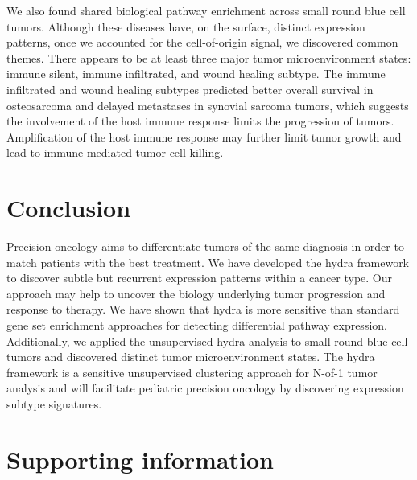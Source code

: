 \documentclass[10pt,letterpaper]{article}
\begin{document}
We also found shared biological pathway enrichment across small round blue cell tumors. Although these diseases have, on the surface, distinct expression patterns, once we accounted for the cell-of-origin signal, we discovered common themes. There appears to be at least three major tumor microenvironment states: immune silent, immune infiltrated, and wound healing subtype. The immune infiltrated and wound healing subtypes predicted better overall survival in osteosarcoma and delayed metastases in synovial sarcoma tumors, which suggests the involvement of the host immune response limits the progression of tumors. Amplification of the host immune response may further limit tumor growth and lead to immune-mediated tumor cell killing.

\section*{Conclusion}
Precision oncology aims to differentiate tumors of the same diagnosis in order to match patients with the best treatment. We have developed the hydra framework to discover subtle but recurrent expression patterns within a cancer type. Our approach may help to uncover the biology underlying tumor progression and response to therapy. We have shown that hydra is more sensitive than standard gene set enrichment approaches for detecting differential pathway expression. Additionally, we applied the unsupervised hydra analysis to small round blue cell tumors and discovered distinct tumor microenvironment states. The hydra framework is a sensitive unsupervised clustering approach for N-of-1 tumor analysis and will facilitate pediatric precision oncology by discovering expression subtype signatures.

\section*{Supporting information}

\end{document}
